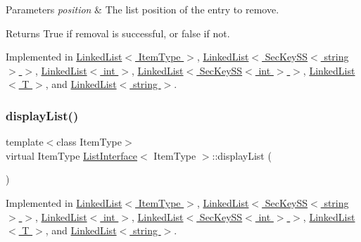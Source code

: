 \begin{DoxyParams}{Parameters}
{\em position} & The list position of the entry to remove. \\
\hline
\end{DoxyParams}
\begin{DoxyReturn}{Returns}
True if removal is successful, or false if not. 
\end{DoxyReturn}


Implemented in \hyperlink{classLinkedList_a7dc3cca217b45c6fe5d28c9d16b7bf9e}{Linked\+List$<$ Item\+Type $>$}, \hyperlink{classLinkedList_a7dc3cca217b45c6fe5d28c9d16b7bf9e}{Linked\+List$<$ Sec\+Key\+S\+S$<$ string $>$ $>$}, \hyperlink{classLinkedList_a7dc3cca217b45c6fe5d28c9d16b7bf9e}{Linked\+List$<$ int $>$}, \hyperlink{classLinkedList_a7dc3cca217b45c6fe5d28c9d16b7bf9e}{Linked\+List$<$ Sec\+Key\+S\+S$<$ int $>$ $>$}, \hyperlink{classLinkedList_a7dc3cca217b45c6fe5d28c9d16b7bf9e}{Linked\+List$<$ T $>$}, and \hyperlink{classLinkedList_a7dc3cca217b45c6fe5d28c9d16b7bf9e}{Linked\+List$<$ string $>$}.

\mbox{\label{classListInterface_a2f2f533e962dd89111ee50b972dc28e7}} 
\subsubsection{\texorpdfstring{display\+List()}{displayList()}}
{\footnotesize\ttfamily template$<$class Item\+Type$>$ \\
virtual Item\+Type \hyperlink{classListInterface}{List\+Interface}$<$ Item\+Type $>$\+::display\+List (\begin{DoxyParamCaption}{ }\end{DoxyParamCaption})\hspace{0.3cm}{\ttfamily [pure virtual]}}



Implemented in \hyperlink{classLinkedList_a65fb58d9f9b8af41e9569d1dc3200583}{Linked\+List$<$ Item\+Type $>$}, \hyperlink{classLinkedList_a65fb58d9f9b8af41e9569d1dc3200583}{Linked\+List$<$ Sec\+Key\+S\+S$<$ string $>$ $>$}, \hyperlink{classLinkedList_a65fb58d9f9b8af41e9569d1dc3200583}{Linked\+List$<$ int $>$}, \hyperlink{classLinkedList_a65fb58d9f9b8af41e9569d1dc3200583}{Linked\+List$<$ Sec\+Key\+S\+S$<$ int $>$ $>$}, \hyperlink{classLinkedList_a65fb58d9f9b8af41e9569d1dc3200583}{Linked\+List$<$ T $>$}, and \hyperlink{classLinkedList_a65fb58d9f9b8af41e9569d1dc3200583}{Linked\+List$<$ string $>$}.

